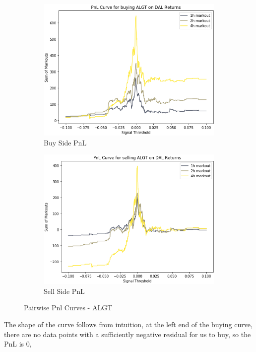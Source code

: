 \documentclass{article}
\begin{document}
\begin{figure}[h!]
  \centering
  \begin{subfigure}{.5\textwidth}
    \centering
    \includegraphics[width=.95\linewidth]{../Figures/pair_Pnl_Curve_buy_ALGT_on_DAL.png}
    \caption{Buy Side PnL}
  \end{subfigure}%
  \begin{subfigure}{.5\textwidth}
    \centering
    \includegraphics[width=.95\linewidth]{../Figures/pair_Pnl_Curve_sell_ALGT_on_DAL.png}
    \caption{Sell Side PnL}
  \end{subfigure}
  \caption{Pairwise Pnl Curves - ALGT}
\end{figure}
The shape of the curve follows from intuition, at the left end of the buying curve, there
are no data points with a sufficiently negative residual for us to buy, so the PnL is 0,
\end{document}
